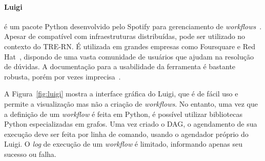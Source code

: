 


\paragraph{Luigi}
é um pacote Python desenvolvido pelo Spotify para gerenciamento de \textit{workflows}~\cite{batch}. Apesar de compatível com infraestruturas distribuídas, pode ser utilizado no contexto do TRE-RN. É utilizada em grandes empresas como Foursquare e Red Hat~\cite{redhatwebsite}, dispondo de uma vasta comunidade de usuários que ajudam na resolução de dúvidas. A documentação para a usabilidade da ferramenta é bastante robusta, porém por vezes imprecisa~\cite{luigidocs}. 

A Figura~\ref{fig:luigi} mostra a interface gráfica do Luigi, que é de fácil uso e permite a visualização mas não a criação de \textit{workflows}. No entanto, uma vez que a definição de um \textit{workflow} é feita em Python, é possível utilizar bibliotecas Python especializadas em grafos. Uma vez criado o DAG, o agendamento de sua execução deve ser feita por linha de comando, usando o agendador próprio do Luigi. 
O \textit{log} de execução de um \textit{workflow} é limitado, informando apenas seu sucesso ou falha.

